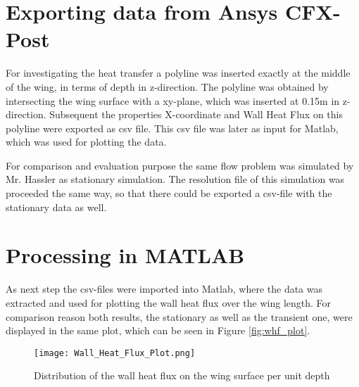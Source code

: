 \section{Exporting data from Ansys CFX-Post}
For investigating the heat transfer a polyline was inserted exactly at the middle of the wing, in terms of depth in z-direction. The polyline was obtained by intersecting the wing surface with a xy-plane, which was inserted at 0.15m in z-direction. 
Subsequent the properties X-coordinate and Wall Heat Flux on this polyline were exported as csv file. This csv file was later as input for Matlab, which was used for plotting the data.

For comparison and evaluation purpose the same flow problem was simulated by Mr. Hassler as stationary simulation. The resolution file of this simulation was proceeded the same way, so that there could be exported a csv-file with the stationary data as well.
\section{Processing in MATLAB\textsuperscript{\textregistered}}
As next step the csv-files were imported into Matlab, where the data was extracted and used for plotting the wall heat flux over the wing length. For comparison reason both results, the stationary as well as the transient one, were displayed in the same plot, which can be seen in Figure \ref{fig:whf_plot}.

\begin{figure}[h]
\centering
\texttt{[image: Wall\_Heat\_Flux\_Plot.png]}
\caption{Distribution of the wall heat flux on the wing surface per unit depth}
\label{fig:wtf_plot}
\end{figure}


